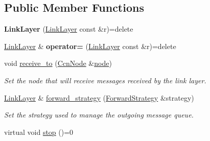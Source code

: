 \subsection*{Public Member Functions}
\begin{DoxyCompactItemize}
\item 
\hypertarget{classsma_1_1LinkLayer_a1b66460173365ef6133b983421fe7bb9}{{\bfseries Link\-Layer} (\hyperlink{classsma_1_1LinkLayer}{Link\-Layer} const \&r)=delete}\label{classsma_1_1LinkLayer_a1b66460173365ef6133b983421fe7bb9}

\item 
\hypertarget{classsma_1_1LinkLayer_a2058e2c88d9f67b49561f2196631a91d}{\hyperlink{classsma_1_1LinkLayer}{Link\-Layer} \& {\bfseries operator=} (\hyperlink{classsma_1_1LinkLayer}{Link\-Layer} const \&r)=delete}\label{classsma_1_1LinkLayer_a2058e2c88d9f67b49561f2196631a91d}

\item 
\hypertarget{classsma_1_1LinkLayer_a151cdb38db1e95fe67e215a9cefa7168}{void \hyperlink{classsma_1_1LinkLayer_a151cdb38db1e95fe67e215a9cefa7168}{receive\-\_\-to} (\hyperlink{classsma_1_1CcnNode}{Ccn\-Node} \&\hyperlink{classsma_1_1LinkLayer_af1c41f5c6906c2be5757d4a615f3324a}{node})}\label{classsma_1_1LinkLayer_a151cdb38db1e95fe67e215a9cefa7168}

\begin{DoxyCompactList}\small\item\em Set the node that will receive messages received by the link layer. \end{DoxyCompactList}\item 
\hyperlink{classsma_1_1LinkLayer}{Link\-Layer} \& \hyperlink{classsma_1_1LinkLayer_af3c4ce4bed281e14bbc676988b5acc31}{forward\-\_\-strategy} (\hyperlink{classsma_1_1ForwardStrategy}{Forward\-Strategy} \&strategy)
\begin{DoxyCompactList}\small\item\em Set the strategy used to manage the outgoing message queue. \end{DoxyCompactList}\item 
\hypertarget{classsma_1_1LinkLayer_aff0a6b5cf4c38b7658682b7d6fcc8a34}{virtual void \hyperlink{classsma_1_1LinkLayer_aff0a6b5cf4c38b7658682b7d6fcc8a34}{stop} ()=0}\label{classsma_1_1LinkLayer_aff0a6b5cf4c38b7658682b7d6fcc8a34}


\end{DoxyCompactItemize}

